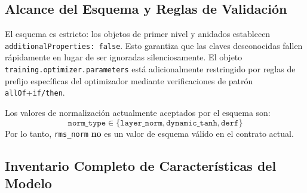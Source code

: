 \subsection{Alcance del Esquema y Reglas de Validación}
\label{sec:schema-validation}

El esquema es estricto: los objetos de primer nivel y anidados establecen \texttt{additionalProperties: false}. Esto garantiza que las claves desconocidas fallen rápidamente en lugar de ser ignoradas silenciosamente. El objeto \texttt{training.optimizer.parameters} está adicionalmente restringido por reglas de prefijo específicas del optimizador mediante verificaciones de patrón \texttt{allOf}+\texttt{if/then}.

Los valores de normalización actualmente aceptados por el esquema son:
\[
\texttt{norm\_type} \in \{\texttt{layer\_norm}, \texttt{dynamic\_tanh}, \texttt{derf}\}
\]
Por lo tanto, \texttt{rms\_norm} \textbf{no} es un valor de esquema válido en el contrato actual.

\subsection{Inventario Completo de Características del Modelo}

